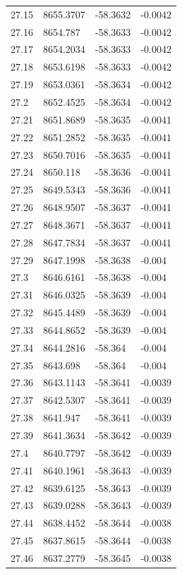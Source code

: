 \begin{table}[H]
\begin{tabular}{llll}
27.15 & 8655.3707 & -58.3632 & -0.0042 \\
27.16 & 8654.787 & -58.3633 & -0.0042 \\
27.17 & 8654.2034 & -58.3633 & -0.0042 \\
27.18 & 8653.6198 & -58.3633 & -0.0042 \\
27.19 & 8653.0361 & -58.3634 & -0.0042 \\
27.2 & 8652.4525 & -58.3634 & -0.0042 \\
27.21 & 8651.8689 & -58.3635 & -0.0041 \\
27.22 & 8651.2852 & -58.3635 & -0.0041 \\
27.23 & 8650.7016 & -58.3635 & -0.0041 \\
27.24 & 8650.118 & -58.3636 & -0.0041 \\
27.25 & 8649.5343 & -58.3636 & -0.0041 \\
27.26 & 8648.9507 & -58.3637 & -0.0041 \\
27.27 & 8648.3671 & -58.3637 & -0.0041 \\
27.28 & 8647.7834 & -58.3637 & -0.0041 \\
27.29 & 8647.1998 & -58.3638 & -0.004 \\
27.3 & 8646.6161 & -58.3638 & -0.004 \\
27.31 & 8646.0325 & -58.3639 & -0.004 \\
27.32 & 8645.4489 & -58.3639 & -0.004 \\
27.33 & 8644.8652 & -58.3639 & -0.004 \\
27.34 & 8644.2816 & -58.364 & -0.004 \\
27.35 & 8643.698 & -58.364 & -0.004 \\
27.36 & 8643.1143 & -58.3641 & -0.0039 \\
27.37 & 8642.5307 & -58.3641 & -0.0039 \\
27.38 & 8641.947 & -58.3641 & -0.0039 \\
27.39 & 8641.3634 & -58.3642 & -0.0039 \\
27.4 & 8640.7797 & -58.3642 & -0.0039 \\
27.41 & 8640.1961 & -58.3643 & -0.0039 \\
27.42 & 8639.6125 & -58.3643 & -0.0039 \\
27.43 & 8639.0288 & -58.3643 & -0.0039 \\
27.44 & 8638.4452 & -58.3644 & -0.0038 \\
27.45 & 8637.8615 & -58.3644 & -0.0038 \\
27.46 & 8637.2779 & -58.3645 & -0.0038 \\

\end{tabular}
\end{table}
